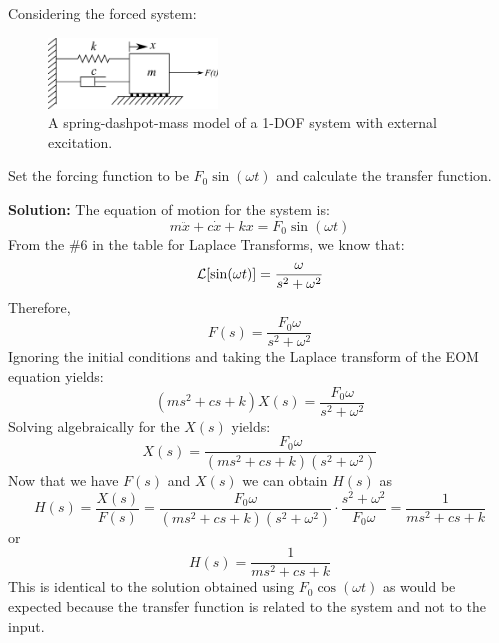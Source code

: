 \documentclass[12pt,letter]{article}
\begin{document}
\begin{example}
	Considering the forced system:
	\begin{figure}[H]
		\centering
		\includegraphics[width=0.4\textwidth]{../figures/1-DOF-spring_dashpot_mass_horizontal_forced.png}
		\caption{A spring-dashpot-mass model of a 1-DOF system with external excitation.}
	\end{figure}
	Set the forcing function to be $F_0 \sin(\omega t)$ and calculate the transfer function. 
	
	\noindent\textbf{Solution:} The equation of motion for the system is:
	\begin{equation}
		m\ddot{x} + c\dot{x} +kx = F_0 \sin(\omega t)
	\end{equation}
	From the \#6 in the table for Laplace Transforms, we know that:
	\begin{equation}
		\mathcal{L}{\left[\sin(\omega t)\right]} = \frac{\omega}{s^2+\omega^2}
	\end{equation}
	Therefore, 
	\begin{equation}
	F(s) = \frac{F_0\omega}{s^2+\omega^2}
	\end{equation}
	Ignoring the initial conditions and taking the Laplace transform of the EOM equation yields:
	\begin{equation}
	(ms^2 + cs +k)X(s) = \frac{F_0 \omega}{s^2+\omega^2} 
	\end{equation}
	Solving algebraically for the $X(s)$ yields: 
	\begin{equation}
	X(s) = \frac{F_0\omega}{(ms^2 + cs +k)(s^2+\omega^2)}
	\end{equation}
	Now that we have $F(s)$ and $X(s)$ we can obtain $H(s)$ as  
	\begin{equation}
	H(s) = \frac{X(s)}{F(s)} = \frac{F_0 \omega }{(ms^2 + cs +k)(s^2+\omega^2)} \cdot \frac{s^2+\omega^2}{F_0 \omega} = \frac{1}{ms^2+cs+k}
	\end{equation}
	or 
	\begin{equation}
	H(s) = \frac{1}{ms^2+cs+k}
	\end{equation}
	This is identical to the solution obtained using $F_0 \cos(\omega t)$ as would be expected because the transfer function is related to the system and not to the input. 
\end{example}  
\end{document}
